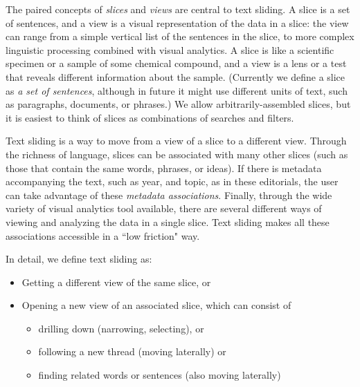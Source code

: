 \documentclass{sig-alternate}
\begin{document}
The paired concepts of \emph{slices} and \emph{views} are central to text sliding. A slice is a set of sentences, and a view is a visual representation of the data in a slice: the view can range from a simple vertical list of the sentences in the slice, to more complex linguistic processing combined with visual analytics.  A slice is like a scientific specimen or a sample of some chemical compound,  and a view is a lens or a test that reveals different information about the sample.
(Currently we define a slice as \emph{a set of sentences}, although in future it might use different units of text, such as paragraphs, documents, or phrases.) We allow arbitrarily-assembled slices, but it is easiest to think of slices as combinations of searches and filters.  


Text sliding is a way to move from a view of a slice to a different view. Through the richness of language, slices can be associated with many other slices (such as those that contain the same  words, phrases, or ideas). If there is metadata accompanying the text, such as year, and topic, as in these editorials, the user can take advantage of these  \emph{metadata associations}.  Finally, through the wide variety of visual analytics tool available, there are several different ways of viewing and analyzing the data in a single slice. Text sliding makes all these associations accessible in a ``low friction" way.

In detail, we define text sliding as:
\begin{itemize}
	\item Getting a different view of the same slice, or
	\item Opening a new view of an associated slice, which can consist of
	\begin{itemize}
	  \item drilling down (narrowing, selecting), or
	  \item following a new thread (moving laterally) or
	  \item finding related words or sentences  (also moving laterally)
	 \end{itemize}
\end{itemize}
\end{document}
